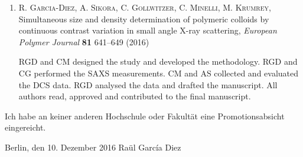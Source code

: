 \begin{enumerate}
    \item \textsc{R. Garcia-Diez, A. Sikora, C. Gollwitzer, C. Minelli, M. Krumrey}, Simultaneous size and density determination of polymeric colloids by continuous contrast variation in small angle {{X}}-ray scattering, \emph{European Polymer Journal} \textbf{81} 641–649 (2016) 

        \hspace{20pt} RGD and CM designed the study and developed the methodology. RGD and CG performed the SAXS measurements. CM and AS collected and evaluated the DCS data. RGD analysed the data and drafted the manuscript. All authors read, approved and contributed to the final manuscript.


\end{enumerate}


Ich habe an keiner anderen Hochschule oder Fakultät eine Promotionsabsicht eingereicht.

\vspace{3cm}

\noindent Berlin, den 10. Dezember 2016 \hfill Raül Garc\'{i}a Diez

\cleardoublepage

